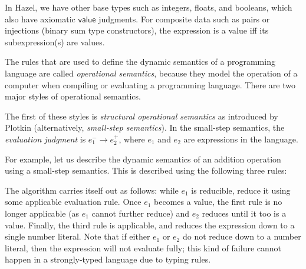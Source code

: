 \begin{singlespace}
  \begin{mathpar}
  \end{mathpar}
\end{singlespace}

In Hazel, we have other base types such as integers, floats, and booleans, which also have axiomatic $\textsf{value}$ judgments. For composite data such as pairs or injections (binary sum type constructors), the expression is a value iff its subexpression(s) are values.

The rules that are used to define the dynamic semantics of a programming language are called \textit{operational semantics}, because they model the operation of a computer when compiling or evaluating a programming language. There are two major styles of operational semantics.

The first of these styles is \textit{structural operational semantics} as introduced by Plotkin \cite{plotkin1981structural} (alternatively, \textit{small-step semantics}). In the small-step semantics, the \textit{evaluation judgment} is $e_1^-\to e_2^+$, where $e_1$ and $e_2$ are expressions in the language.

For example, let us describe the dynamic semantics of an addition operation using a small-step semantics. This is described using the following three rules:

\begin{singlespace}
\end{singlespace}

The algorithm carries itself out as follows: while $e_1$ is reducible, reduce it using some applicable evaluation rule. Once $e_1$ becomes a value, the first rule is no longer applicable (as $e_1$ cannot further reduce) and $e_2$ reduces until it too is a value. Finally, the third rule is applicable, and reduces the expression down to a single number literal. Note that if either $e_1$ or $e_2$ do not reduce down to a number literal, then the expression will not evaluate fully; this kind of failure cannot happen in a strongly-typed language due to typing rules.

